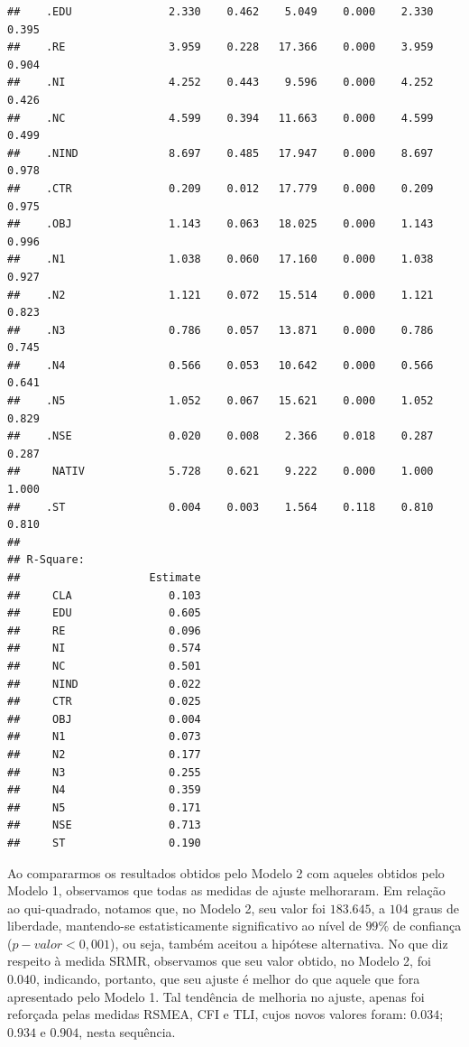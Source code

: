 \documentclass[
  12pt,
]{article}
\begin{document}
\begin{verbatim}
##    .EDU               2.330    0.462    5.049    0.000    2.330    0.395
##    .RE                3.959    0.228   17.366    0.000    3.959    0.904
##    .NI                4.252    0.443    9.596    0.000    4.252    0.426
##    .NC                4.599    0.394   11.663    0.000    4.599    0.499
##    .NIND              8.697    0.485   17.947    0.000    8.697    0.978
##    .CTR               0.209    0.012   17.779    0.000    0.209    0.975
##    .OBJ               1.143    0.063   18.025    0.000    1.143    0.996
##    .N1                1.038    0.060   17.160    0.000    1.038    0.927
##    .N2                1.121    0.072   15.514    0.000    1.121    0.823
##    .N3                0.786    0.057   13.871    0.000    0.786    0.745
##    .N4                0.566    0.053   10.642    0.000    0.566    0.641
##    .N5                1.052    0.067   15.621    0.000    1.052    0.829
##    .NSE               0.020    0.008    2.366    0.018    0.287    0.287
##     NATIV             5.728    0.621    9.222    0.000    1.000    1.000
##    .ST                0.004    0.003    1.564    0.118    0.810    0.810
## 
## R-Square:
##                    Estimate
##     CLA               0.103
##     EDU               0.605
##     RE                0.096
##     NI                0.574
##     NC                0.501
##     NIND              0.022
##     CTR               0.025
##     OBJ               0.004
##     N1                0.073
##     N2                0.177
##     N3                0.255
##     N4                0.359
##     N5                0.171
##     NSE               0.713
##     ST                0.190
\end{verbatim}

\normalsize
\onehalfspacing

Ao compararmos os resultados obtidos pelo Modelo 2 com aqueles obtidos
pelo Modelo 1, observamos que todas as medidas de ajuste melhoraram. Em
relação ao qui-quadrado, notamos que, no Modelo 2, seu valor foi
\(183.645\), a \(104\) graus de liberdade, mantendo-se estatisticamente
significativo ao nível de \(99\%\) de confiança (\(p-valor < 0,001\)),
ou seja, também aceitou a hipótese alternativa. No que diz respeito à
medida SRMR, observamos que seu valor obtido, no Modelo 2, foi
\(0.040\), indicando, portanto, que seu ajuste é melhor do que aquele
que fora apresentado pelo Modelo 1. Tal tendência de melhoria no ajuste,
apenas foi reforçada pelas medidas RSMEA, CFI e TLI, cujos novos valores
foram: \(0.034\); \(0.934\) e \(0.904\), nesta sequência.
\end{document}

